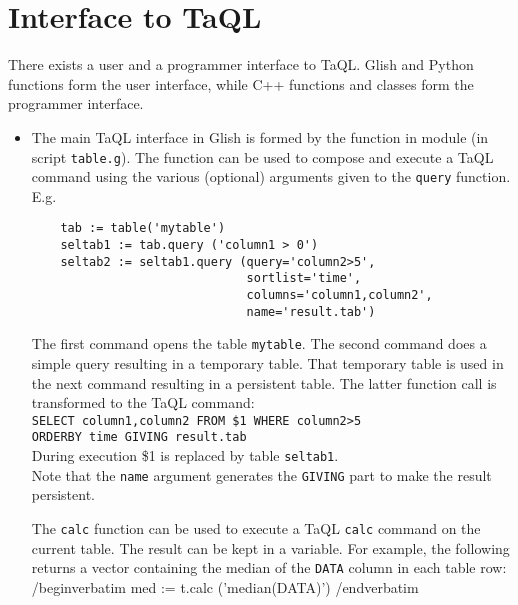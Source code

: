\section{\label{TAQL:GLISHPC}Interface to TaQL}
There exists a user and a programmer interface to TaQL.
Glish and Python functions form the user interface, while C++ functions
and classes form the programmer interface.
\begin{itemize}
\item
  The main TaQL interface in Glish is formed by the
   function in module
   (in script \texttt{table.g}).
  The function can be used
  to compose and execute a TaQL command using the various (optional)
  arguments given to the \texttt{query} function. E.g.
  \begin{verbatim}
    tab := table('mytable')
    seltab1 := tab.query ('column1 > 0')
    seltab2 := seltab1.query (query='column2>5',
                              sortlist='time',
                              columns='column1,column2',
                              name='result.tab')
  \end{verbatim}
  The first command opens the table \texttt{mytable}.
  The second command does a simple query resulting in a temporary
  table. That temporary table is used in the next command resulting in
  a persistent table. The latter function call is transformed to
  the TaQL command:
  \\\texttt{SELECT column1,column2 FROM \$1 WHERE column2>5}
  \\\texttt{ORDERBY time GIVING result.tab}
  \\During execution \$1 is replaced by table \texttt{seltab1}.
  \\Note that the \texttt{name} argument
  generates the \texttt{GIVING} part to make the result persistent.

  The \texttt{calc} function can be used to execute a TaQL
  \texttt{calc} command on the current table. The result can be kept
  in a variable. For example, the following returns a vector containing
  the median of the \texttt{DATA} column in each table row:
  /begin{verbatim}
    med := t.calc ('median(DATA)')
  /end{verbatim}


\end{itemize}
